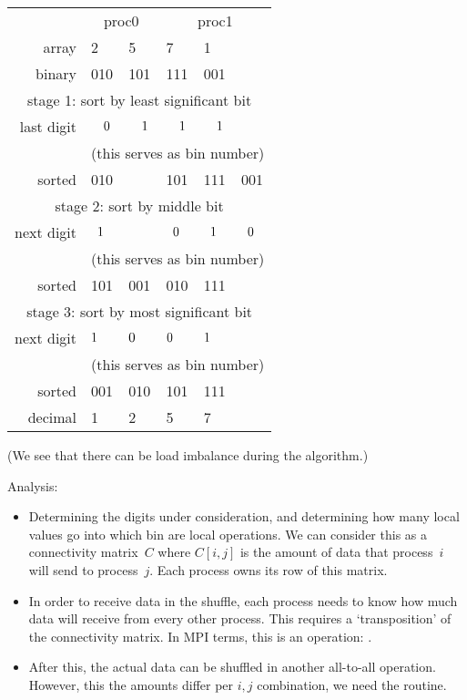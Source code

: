 \begin{tabular}{rlllll}
  \midrule
            & \multicolumn{2}{c}{proc0}&\multicolumn{3}{c}{proc1}\\
  array     & 2&5&7&1&\\
  binary    & 010& 101& 111& 001&\\
  \midrule
  \multicolumn{6}{c}{stage 1: sort by least significant bit}\\
  \midrule
  last digit&   $\hphantom{00}0$&   $\hphantom{00}1$&   $\hphantom{00}1$&   $\hphantom{00}1$&\\
  &\multicolumn{5}{c}{(this serves as bin number)}\\
  sorted    & 010&    & 101& 111& 001\\
  \midrule
  \multicolumn{6}{c}{stage 2: sort by middle bit}\\
  \midrule
  next digit&  $\hphantom{0}1 $&                    &$\hphantom{0}0 $&  $\hphantom{0}1 $&  $\hphantom{0}0$\\
  &\multicolumn{5}{c}{(this serves as bin number)}\\
  sorted    & 101& 001& 010& 111&\\
  \midrule
  \multicolumn{6}{c}{stage 3: sort by most significant bit}\\
  \midrule
  next digit& $\hphantom{}1  $& $\hphantom{}0  $& $\hphantom{}0  $& $\hphantom{}1$&\\
  &\multicolumn{5}{c}{(this serves as bin number)}\\
  sorted    & 001& 010& 101& 111&\\
  decimal   & 1  & 2  & 5  & 7&\\
  \midrule
\end{tabular}

(We see that there can be load imbalance during the algorithm.)

Analysis:
\begin{itemize}
\item Determining the digits under consideration, and determining how
  many local values go into which bin are local operations. We can
  consider this as a connectivity matrix~$C$ where $C[i,j]$ is the
  amount of data that process~$i$ will send to process~$j$. Each
  process owns its row of this matrix.
\item In order to receive data in the shuffle, each process needs to know
  how much data will receive from every other process. This requires a
  `transposition' of the connectivity matrix. In MPI terms, this is an
   operation: .
\item After this, the actual data can be shuffled in another
  all-to-all operation. However, this the amounts differ per $i,j$
  combination, we need the  routine.
\end{itemize}

